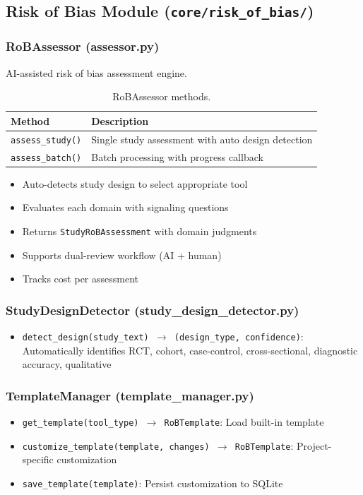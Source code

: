 \documentclass[11pt,a4paper]{article}
\begin{document}
\subsection{Risk of Bias Module (\texttt{core/risk\_of\_bias/})}

\subsubsection{RoBAssessor (assessor.py)}

AI-assisted risk of bias assessment engine.

\begin{table}[H]
\centering\small
\begin{tabular}{p{4cm}p{9cm}}
\toprule
\textbf{Method} & \textbf{Description} \\
\midrule
\texttt{assess\_study()} & Single study assessment with auto design detection \\
\texttt{assess\_batch()} & Batch processing with progress callback \\
\bottomrule
\end{tabular}
\caption{RoBAssessor methods.}
\end{table}

\begin{itemize}[nosep]
  \item Auto-detects study design to select appropriate tool
  \item Evaluates each domain with signaling questions
  \item Returns \texttt{StudyRoBAssessment} with domain judgments
  \item Supports dual-review workflow (AI + human)
  \item Tracks cost per assessment
\end{itemize}

\subsubsection{StudyDesignDetector (study\_design\_detector.py)}
\begin{itemize}[nosep]
  \item \texttt{detect\_design(study\_text) $\to$ (design\_type, confidence)}: Automatically identifies RCT, cohort, case-control, cross-sectional, diagnostic accuracy, qualitative
\end{itemize}

\subsubsection{TemplateManager (template\_manager.py)}
\begin{itemize}[nosep]
  \item \texttt{get\_template(tool\_type) $\to$ RoBTemplate}: Load built-in template
  \item \texttt{customize\_template(template, changes) $\to$ RoBTemplate}: Project-specific customization
  \item \texttt{save\_template(template)}: Persist customization to SQLite
\end{itemize}
\end{document}
